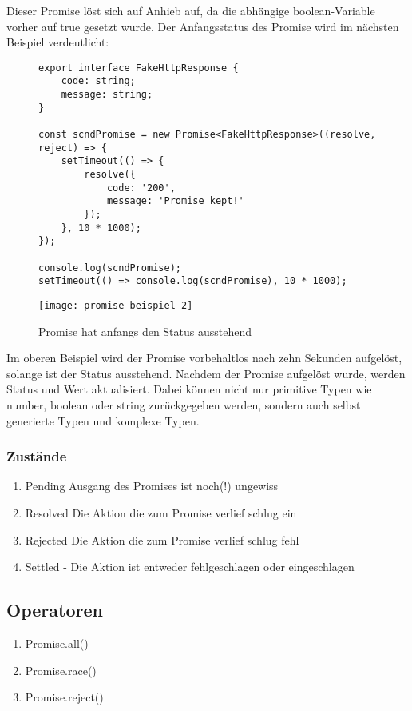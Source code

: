 \noindent
Dieser Promise löst sich auf Anhieb auf, da die abhängige boolean-Variable vorher auf true gesetzt wurde. Der Anfangsstatus des Promise wird im nächsten Beispiel verdeutlicht:

\begin{figure}[H]
\begin{lstlisting}
export interface FakeHttpResponse {
    code: string;
    message: string;
}

const scndPromise = new Promise<FakeHttpResponse>((resolve, reject) => {
    setTimeout(() => {
        resolve({
            code: '200',
            message: 'Promise kept!'
        });
    }, 10 * 1000);
});

console.log(scndPromise);
setTimeout(() => console.log(scndPromise), 10 * 1000);
\end{lstlisting}
\end{figure}

\begin{figure}[H]
\centering
\texttt{[image: promise-beispiel-2]}
\caption{Promise hat anfangs den Status \glqq{}ausstehend\grqq{}}
\end{figure}

Im oberen Beispiel wird der Promise vorbehaltlos nach zehn Sekunden aufgelöst, solange ist der Status ausstehend. Nachdem der Promise aufgelöst wurde, werden Status und Wert aktualisiert. Dabei können nicht nur primitive Typen wie number, boolean oder string zurückgegeben werden, sondern auch selbst generierte Typen und komplexe Typen.
\subsubsection{Zustände}

\begin{enumerate} 
\item Pending Ausgang des Promises ist noch(!) ungewiss
\item Resolved Die Aktion die zum Promise verlief schlug ein
\item Rejected Die Aktion die zum Promise verlief schlug fehl
\item Settled - Die Aktion ist entweder fehlgeschlagen oder eingeschlagen
\end{enumerate}

\subsection{Operatoren}

\begin{enumerate} 
\item Promise.all()
\item Promise.race() 
\item Promise.reject()
\end{enumerate}

